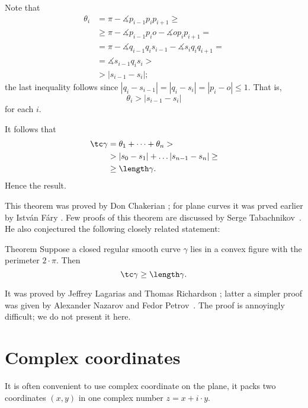 Note that 
\begin{align*}
\theta_i&=\pi-\measuredangle p_{i-1}p_ip_{i+1}\ge
\\
&\ge\pi-\measuredangle p_{i-1}p_io-\measuredangle op_ip_{i+1}=
\\
&=\pi-\measuredangle q_{i-1}q_is_{i-1}-\measuredangle s_iq_iq_{i+1}=
\\
&=\measuredangle s_{i-1}q_is_i>
\\
&>|s_{i-1}-s_i|;
\end{align*}
the last inequality follows since $|q_i-s_{i-1}|=|q_i-s_i|=|p_i-o|\le 1$.
That is, 
\[\theta_i>|s_{i-1}-s_i|\]
for each $i$.

It follows that
\begin{align*}
\tc \gamma
&=\theta_1+\dots+\theta_n>
\\
&> |s_{0}-s_1|+\dots |s_{n-1}-s_n|\ge 
\\
&\ge\length \gamma.
\end{align*}
Hence the result.
\qeds

This theorem was proved by Don Chakerian \cite{chakerian};
for plane curves it was prved earlier by Istv\'{a}n F\'{a}ry \cite{fary-DNA}.
Few proofs of this theorem are discussed by Serge Tabachnikov~\cite{tabachnikov}.
He also conjectured the following closely related statement:

\begin{thm}{Theorem}
Suppose a closed regular smooth curve $\gamma$ lies in a convex figure with the perimeter $2\cdot \pi$.
Then 
\[\tc\gamma\ge \length\gamma.\]

\end{thm}

It was proved by Jeffrey Lagarias and Thomas Richardson \cite{lagarias-richardso}; latter a simpler proof was given by Alexander Nazarov and Fedor Petrov~\cite{nazarov-petrov}.
The proof is annoyingly difficult; we do not present it here.












\section*{Complex coordinates}

It is often convenient to use complex coordinate on the plane,
it packs two coordinates $(x,y)$ in one complex number $z=x+i\cdot y$.

